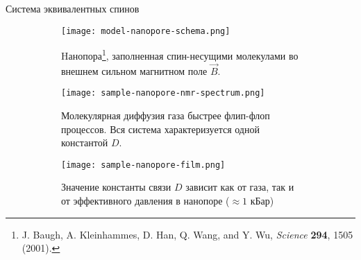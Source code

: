 \begin{frame}{Система эквивалентных спинов}
  \begin{figure}
    \begin{subfigure}[t]{0.32\textwidth}
      \texttt{[image: model-nanopore-schema.png]}
      \caption{
        Hанопора\footnote[frame]{J. Baugh, A. Kleinhammes, D. Han, Q. Wang, and Y. Wu, \textit{Science} \textbf{294}, 1505 (2001).},
        заполненная спин-несущими молекулами во внешнем сильном магнитном поле $\vec B$.
      }
    \end{subfigure}
    \hfill
    \begin{subfigure}[t]{0.32\textwidth}
      \texttt{[image: sample-nanopore-nmr-spectrum.png]}
      \caption{
        Молекулярная диффузия газа быстрее флип-флоп процессов.
        Вся система характеризуется одной константой $D$.
      }
    \end{subfigure}
    \hfill
    \begin{subfigure}[t]{0.32\textwidth}
      \texttt{[image: sample-nanopore-film.png]}
      \caption{
        Значение константы связи $D$ зависит как от газа,
        так и от эффективного давления в нанопоре ($\approx 1$ кБар)
      }
    \end{subfigure}
    \captionsetup{skip=-0.1mm}
    \caption{}
  \end{figure}

%
%
\end{frame}
